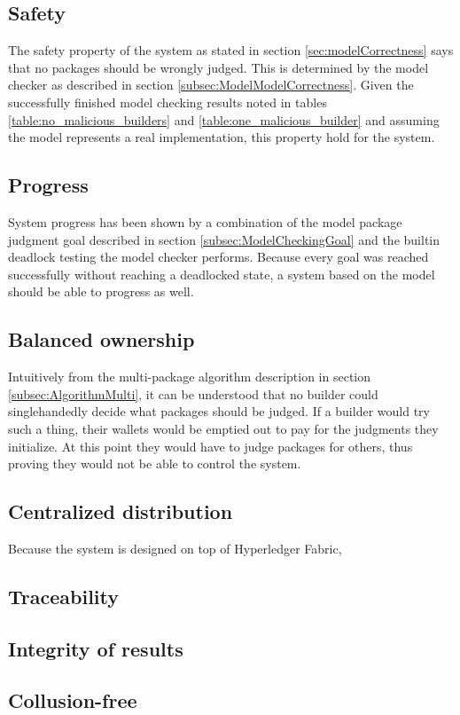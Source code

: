 \subsection{Safety}

The safety property of the system as stated in section \ref{sec:modelCorrectness} says that no packages should be wrongly judged. This is determined by the model checker as described in section \ref{subsec:ModelModelCorrectness}. Given the successfully finished model checking results noted in tables \ref{table:no_malicious_builders} and \ref{table:one_malicious_builder} and assuming the model represents a real implementation, this property hold for the system.

\subsection{Progress}

System progress has been shown by a combination of the model package judgment goal described in section \ref{subsec:ModelCheckingGoal} and the builtin deadlock testing the model checker performs. Because every goal was reached successfully without reaching a deadlocked state, a system based on the model should be able to progress as well.

\subsection{Balanced ownership}

Intuitively from the multi-package algorithm description in section \ref{subsec:AlgorithmMulti}, it can be understood that no builder could singlehandedly decide what packages should be judged. If a builder would try such a thing, their wallets would be emptied out to pay for the judgments they initialize. At this point they would have to judge packages for others, thus proving they would not be able to control the system. 

\subsection{Centralized distribution}

Because the system is designed on top of Hyperledger Fabric, 

\subsection{Traceability}

\subsection{Integrity of results}

\subsection{Collusion-free}